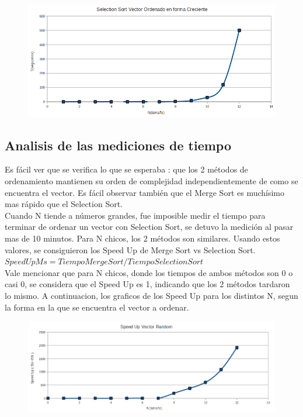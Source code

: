 \begin{figure}[!htp]
\begin{center}
\includegraphics[width=12cm]{Imagenes/SelectionSortordenadocreciente.PNG}
\end{center}
\end{figure} 

\newpage


\subsection{Analisis de las mediciones de tiempo}
Es fácil ver que se verifica lo que se esperaba : que los 2 métodos de ordenamiento mantienen su orden de complejidad independientemente
de como se encuentra el vector. Es fácil observar también que el Merge Sort es muchísimo mas rápido que el Selection Sort.\\
Cuando N tiende a números grandes, fue imposible medir el tiempo para terminar de ordenar un vector con Selection Sort, se detuvo la medición al pasar mas de 10 minutos. Para N chicos, los 2 métodos son similares.
Usando estos valores, se consiguieron los Speed Up de Merge Sort vs Selection Sort.\\
$SpeedUpMs=TiempoMergeSort/TiempoSelectionSort$\\
Vale mencionar que para N chicos, donde los tiempos de ambos métodos son 0 o casi 0, se considera que el Speed Up es 1, indicando que los 2 métodos tardaron lo mismo.
A continuacion, los graficos de los Speed Up para los distintos N, segun la forma en la que se encuentra el vector a ordenar.

\begin{figure}[!htp]
\begin{center}
\includegraphics[width=12cm]{Imagenes/SpeedUpVectorRandom.png}
\end{center}
\end{figure} 


